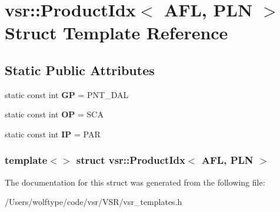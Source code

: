 \hypertarget{structvsr_1_1_product_idx_3_01_a_f_l_00_01_p_l_n_01_4}{\section{vsr\-:\-:Product\-Idx$<$ A\-F\-L, P\-L\-N $>$ Struct Template Reference}
\label{structvsr_1_1_product_idx_3_01_a_f_l_00_01_p_l_n_01_4}
}
\subsection*{Static Public Attributes}
\begin{DoxyCompactItemize}
\item 
\hypertarget{structvsr_1_1_product_idx_3_01_a_f_l_00_01_p_l_n_01_4_a2fe63e6b18d868848abf6af490ec839f}{static const int {\bfseries G\-P} = P\-N\-T\-\_\-\-D\-A\-L}\label{structvsr_1_1_product_idx_3_01_a_f_l_00_01_p_l_n_01_4_a2fe63e6b18d868848abf6af490ec839f}

\item 
\hypertarget{structvsr_1_1_product_idx_3_01_a_f_l_00_01_p_l_n_01_4_af22e7159a156613f2c8512801d7ba9d4}{static const int {\bfseries O\-P} = S\-C\-A}\label{structvsr_1_1_product_idx_3_01_a_f_l_00_01_p_l_n_01_4_af22e7159a156613f2c8512801d7ba9d4}

\item 
\hypertarget{structvsr_1_1_product_idx_3_01_a_f_l_00_01_p_l_n_01_4_a420469a61f5855dc40546e7e245c5b05}{static const int {\bfseries I\-P} = P\-A\-R}\label{structvsr_1_1_product_idx_3_01_a_f_l_00_01_p_l_n_01_4_a420469a61f5855dc40546e7e245c5b05}

\end{DoxyCompactItemize}
\subsubsection*{template$<$$>$ struct vsr\-::\-Product\-Idx$<$ A\-F\-L, P\-L\-N $>$}



The documentation for this struct was generated from the following file\-:\begin{DoxyCompactItemize}
\item 
/\-Users/wolftype/code/vsr/\-V\-S\-R/vsr\-\_\-templates.\-h\end{DoxyCompactItemize}

